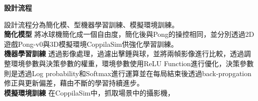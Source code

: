 \begin{flushleft}
{\large \textbf{設計流程}}\\
\end{flushleft}
設計流程分為簡化模、型機器學習訓練、模擬環境訓練。\\
\textbf{簡化模型}
將冰球機簡化成一個自由度，簡化後與Pong的操控相同，並分別透過2D遊戲Pong-v0與3D模擬環境CoppilaSim供強化學習訓練。\\

\textbf{機器學習訓練}
透過影像處理，過濾出擊錘與球，並將兩幀影像進行比較，透過調整環境參數與決策參數的權重，環境參數使用ReLU Function進行優化，決策參數則是透過Log probability和Softmax進行運算並在每局結束後透過back-propgation修正與更新偏差，藉由不斷的學習持續進步。\\

\textbf{模擬環境訓練}
在CoppilaSim中，抓取場景中的攝影機，